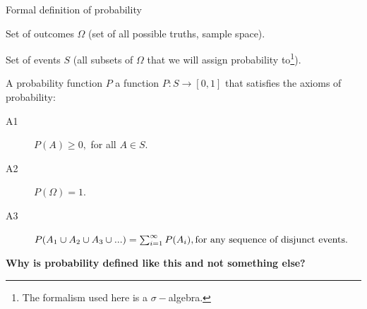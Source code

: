 \begin{frame}{Formal definition of probability}

\begin{small}


\bigskip

Set of outcomes \textbf{$\Omega$} (set of all possible truths, sample space).

\smallskip

Set of events \textbf{$S$}  (all subsets of $\Omega$ that we will assign probability to\footnote{The formalism used here is a $\sigma-$algebra.}).

\bigskip

A probability function $P$ a function $P:S \rightarrow [0,1]$ that satisfies the axioms of probability:

\begin{description}
\item[A1] $P(A) \geq 0, $ for all $A \in S$.
\item[A2] $P(\Omega) = 1.$
\item[A3] $P(A_1 \cup A_2 \cup A_3 \cup ...) = \sum_{i=1}^\infty P(A_i), \break \text{for any sequence of disjunct events}.$
\end{description}

\end{small}

\smallskip
\textbf{Why is probability defined like this and not something else?}


\end{frame}



